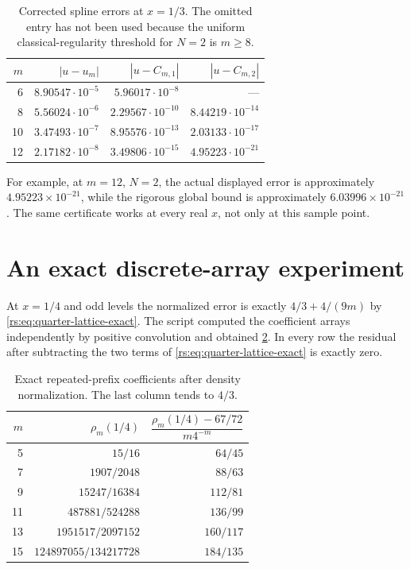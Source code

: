 \documentclass[11pt,a4paper,oneside,openany]{book}
\numberwithin{equation}{chapter}
\theoremstyle{definition}
\theoremstyle{remark}
\begin{document}
\begin{table}[htbp]
\centering
\renewcommand{\arraystretch}{1.2}
\begin{tabular}{rrrr}
\toprule
$m$ & $|u-u_m|$ & $|u-C_{m,1}|$ & $|u-C_{m,2}|$\\
\midrule
6 & $8.90547\cdot10^{-5}$ & $5.96017\cdot10^{-8}$ & ---\\
8 & $5.56024\cdot10^{-6}$ & $2.29567\cdot10^{-10}$ & $8.44219\cdot10^{-14}$\\
10 & $3.47493\cdot10^{-7}$ & $8.95576\cdot10^{-13}$ & $2.03133\cdot10^{-17}$\\
12 & $2.17182\cdot10^{-8}$ & $3.49806\cdot10^{-15}$ & $4.95223\cdot10^{-21}$\\
\bottomrule
\end{tabular}
\caption{Corrected spline errors at $x=1/3$. The omitted entry has
not been used because the uniform classical-regularity threshold
for $N=2$ is $m\geq8$.}\label{rs:tab:corrections}
\end{table}

For example, at $m=12$, $N=2$, the actual displayed error is
approximately $4.95223\times10^{-21}$, while the rigorous global
bound is approximately $6.03996\times10^{-21}$. The same certificate
works at every real $x$, not only at this sample point.

\section{An exact discrete-array experiment}

At $x=1/4$ and odd levels the normalized error is exactly
$4/3+4/(9m)$ by \eqref{rs:eq:quarter-lattice-exact}. The script
computed the coefficient arrays independently by positive
convolution and obtained \cref{rs:tab:lattice}. In every row the
residual after subtracting the two terms of
\eqref{rs:eq:quarter-lattice-exact} is exactly zero.

\begin{table}[htbp]
\centering
\renewcommand{\arraystretch}{1.25}
\begin{tabular}{rrr}
\toprule
$m$ & $\rho_m(1/4)$ & $\dfrac{\rho_m(1/4)-67/72}{m4^{-m}}$\\[4pt]
\midrule
5 & $15/16$ & $64/45$\\
7 & $1907/2048$ & $88/63$\\
9 & $15247/16384$ & $112/81$\\
11 & $487881/524288$ & $136/99$\\
13 & $1951517/2097152$ & $160/117$\\
15 & $124897055/134217728$ & $184/135$\\
\bottomrule
\end{tabular}
\caption{Exact repeated-prefix coefficients after density
normalization. The last column tends to $4/3$.}\label{rs:tab:lattice}
\end{table}
\end{document}
